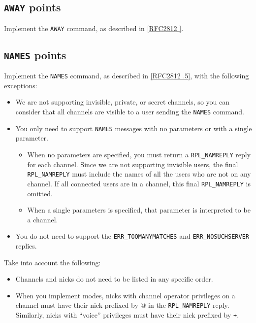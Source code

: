 \documentclass[10pt]{article}
\newcommand{\RFCsection}[2]{\href{http://tools.ietf.org/html/rfc#1\#section-#2}{[RFC#1 \textsection #2]}}
\newcommand{\points}[1]{{\sffamily\mdseries\guillemotleft #1 points\guillemotright{}}}
\begin{document}
\subsection{\texttt{AWAY} \points{5}}

Implement the \texttt{AWAY} command, as described in \RFCsection{2812}{4.1}. 


\subsection{\texttt{NAMES} \points{5}}

Implement the \texttt{NAMES} command, as described in \RFCsection{2812}{3.2.5}, with the following exceptions:

\begin{itemize}
\item We are not supporting invisible, private, or secret channels, so you can consider that all channels are visible to a user sending the \texttt{NAMES} command.
\item You only need to support \texttt{NAMES} messages with no parameters or with a single parameter.
\begin{itemize}
\item When no parameters are specified, you must return a \texttt{RPL\_NAMREPLY} reply for each channel. Since we are not supporting invisible users,
the final \texttt{RPL\_NAMREPLY} must include the names of all the users who are not on any channel. If all connected users are in a channel, this final \texttt{RPL\_NAMREPLY} is omitted.
\item When a single parameters is specified, that parameter is interpreted to be a channel.
\end{itemize}
\item You do not need to support the \texttt{ERR\_TOOMANYMATCHES} and \texttt{ERR\_NOSUCHSERVER} replies.
\end{itemize}

\noindent Take into account the following:

\begin{itemize}
\item Channels and nicks do not need to be listed in any specific order.
\item When you implement modes, nicks with channel operator privileges on a channel must have their nick prefixed by \texttt{$@$} in the \texttt{RPL\_NAMREPLY} reply. Similarly, nicks with ``voice'' privileges must have their nick prefixed by \texttt{+}.
\end{itemize}
\end{document}
